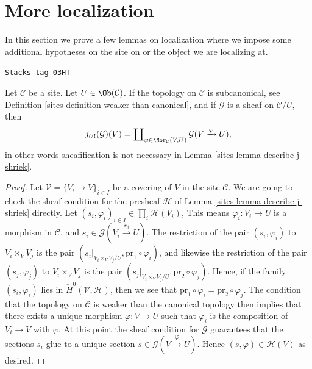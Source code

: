 \section{More localization}
\label{sites-section-more-localize}
In this section we prove a few lemmas on localization where we
impose some additional hypotheses on the site on or the object
we are localizing at.

\begin{lemma}
\label{sites-lemma-describe-j-shriek-good-site}
\href{https://stacks.math.columbia.edu/tag/03HT}{\texttt{Stacks tag 03HT}}

Let $\mathcal{C}$ be a site.
Let $U \in \Ob(\mathcal{C})$.
If the topology on $\mathcal{C}$ is subcanonical, see
Definition \ref{sites-definition-weaker-than-canonical},
and if $\mathcal{G}$ is a sheaf on $\mathcal{C}/U$, then
$$
j_{U!}(\mathcal{G})(V)
=
\coprod\nolimits_{\varphi \in \Mor_\mathcal{C}(V, U)}
\mathcal{G}(V \xrightarrow{\varphi} U),
$$
in other words sheafification is not necessary in
Lemma \ref{sites-lemma-describe-j-shriek}.
\end{lemma}

\begin{proof}

Let $\mathcal{V} = \{V_i \to V\}_{i \in I}$ be a covering of $V$
in the site $\mathcal{C}$.
We are going to check the sheaf condition for the presheaf $\mathcal{H}$
of Lemma \ref{sites-lemma-describe-j-shriek} directly.
Let $(s_i, \varphi_i)_{i \in I} \in \prod_i \mathcal{H}(V_i)$,
This means $\varphi_i : V_i \to U$ is a morphism in $\mathcal{C}$, and
$s_i \in \mathcal{G}(V_i \xrightarrow{\varphi_i} U)$.
The restriction of the pair $(s_i, \varphi_i)$ to
$V_i \times_V V_j$ is the pair
$(s_i|_{V_i \times_V V_j/U}, \text{pr}_1 \circ \varphi_i)$, and
likewise the restriction of the pair $(s_j, \varphi_j)$ to
$V_i \times_V V_j$ is the pair
$(s_j|_{V_i \times_V V_j/U}, \text{pr}_2 \circ \varphi_j)$.
Hence, if the family $(s_i, \varphi_i)$ lies in
$\check{H}^0(\mathcal{V}, \mathcal{H})$, then we see that
$\text{pr}_1 \circ \varphi_i = \text{pr}_2 \circ \varphi_j$.
The condition that the topology on $\mathcal{C}$ is weaker than the canonical
topology then implies that there exists a unique morphism
$\varphi : V \to U$ such that $\varphi_i$ is the composition
of $V_i \to V$ with $\varphi$. At this point the sheaf condition for
$\mathcal{G}$ guarantees that the sections $s_i$ glue to a unique
section $s \in \mathcal{G}(V \xrightarrow{\varphi} U)$.
Hence $(s, \varphi) \in \mathcal{H}(V)$ as desired.
\end{proof}

